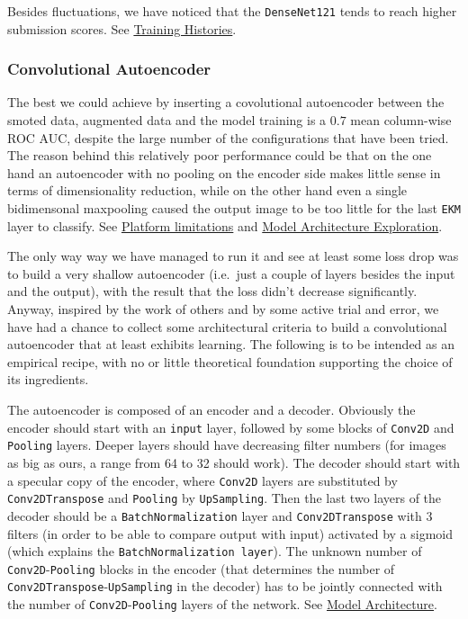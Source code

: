 \documentclass[10pt,]{article}
\begin{document}
Besides fluctuations, we have noticed that the \texttt{DenseNet121}
tends to reach higher submission scores. See
\protect\hyperlink{training-histories}{Training Histories}.

\hypertarget{ae}{%
\subsubsection{Convolutional Autoencoder}\label{ae}}

The best we could achieve by inserting a covolutional autoencoder
between the smoted data, augmented data and the model training is a
\(0.7\) mean column-wise ROC AUC, despite the large number of the
configurations that have been tried. The reason behind this relatively
poor performance could be that on the one hand an autoencoder with no
pooling on the encoder side makes little sense in terms of
dimensionality reduction, while on the other hand even a single
bidimensonal maxpooling caused the output image to be too little for the
last \texttt{EKM} layer to classify. See
\protect\hyperlink{limitations}{Platform limitations} and
\protect\hyperlink{model-architecture}{Model Architecture Exploration}.

The only way way we have managed to run it and see at least some loss
drop was to build a very shallow autoencoder (i.e.~just a couple of
layers besides the input and the output), with the result that the loss
didn't decrease significantly. Anyway, inspired by the work of others
and by some active trial and error, we have had a chance to collect some
architectural criteria to build a convolutional autoencoder that at
least exhibits learning. The following is to be intended as an empirical
recipe, with no or little theoretical foundation supporting the choice
of its ingredients.

The autoencoder is composed of an encoder and a decoder. Obviously the
encoder should start with an \texttt{input} layer, followed by some
blocks of \texttt{Conv2D} and \texttt{Pooling} layers. Deeper layers
should have decreasing filter numbers (for images as big as ours, a
range from 64 to 32 should work). The decoder should start with a
specular copy of the encoder, where \texttt{Conv2D} layers are
substituted by \texttt{Conv2DTranspose} and \texttt{Pooling} by
\texttt{UpSampling}. Then the last two layers of the decoder should be a
\texttt{BatchNormalization} layer and \texttt{Conv2DTranspose} with 3
filters (in order to be able to compare output with input) activated by
a sigmoid (which explains the \texttt{BatchNormalization\ layer}). The
unknown number of \texttt{Conv2D}-\texttt{Pooling} blocks in the encoder
(that determines the number of
\texttt{Conv2DTranspose}-\texttt{UpSampling} in the decoder) has to be
jointly connected with the number of \texttt{Conv2D}-\texttt{Pooling}
layers of the network. See \protect\hyperlink{model-architecture}{Model
Architecture}.
\end{document}
